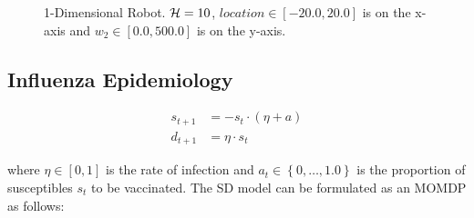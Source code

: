 \begin{figure}[h!]
    \centering
    \caption{1-Dimensional Robot. $ \mathcal{H} = 10 $, $ location \in \left[ -20.0, 20.0 \right]$ is on the x-axis and $ w_2 \in \left[ 0.0, 500.0 \right]$ is on the y-axis. }
    \label{fig:robot1d}
\end{figure}

\subsection{Influenza Epidemiology}
\label{sec:results_ie}

\begin{align*}
    s_{t + 1} &= - s_t \cdot ( \eta + a ) \\
    d_{t+1} &= \eta \cdot s_t 
\end{align*}

where {\footnotesize $ \eta \in [0, 1]$} is the rate of infection and {\footnotesize $ a_t \in \left\lbrace 0, \ldots, 1.0\right\rbrace $} is the proportion of susceptibles {\footnotesize $ s_t $} to be vaccinated. The SD model can be formulated as an MOMDP as follows:

